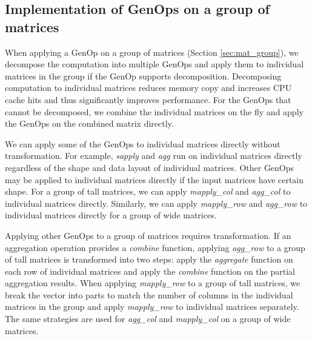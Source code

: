 \subsection{Implementation of GenOps on a group of matrices} \label{sec:group_op}

When applying a GenOp on a group of matrices (Section \ref{sec:mat_group}),
we decompose the computation into multiple GenOps and apply them to individual
matrices in the group if the GenOp supports decomposition. Decomposing computation
to individual matrices reduces memory copy and increases CPU cache hits and thus
significantly improves performance. For the GenOps that cannot be decomposed,
we combine the individual matrices on the fly and apply the GenOps on the combined
matrix directly.

We can apply some of the GenOps to individual matrices directly without
transformation. For example,
\textit{sapply} and \textit{agg} run on individual matrices directly regardless
of the shape and data layout of individual matrices. Other GenOps may be applied
to individual matrices directly if the input matrices have certain shape. For
a group of tall matrices, we can apply
\textit{mapply\_col} and \textit{agg\_col} to individual matrices directly.
Similarly, we can apply \textit{mapply\_row} and \textit{agg\_row} to
individual matrices directly for a group of wide matrices. %

Applying other GenOps to a group of matrices requires transformation. If an aggregation
operation provides a \textit{combine} function, applying \textit{agg\_row} to a group of
tall matrices is transformed into two steps: apply the \textit{aggregate} function on
each row of individual matrices and apply the \textit{combine} function on the partial
aggregation results. When applying \textit{mapply\_row} to a group of tall matrices,
we break the vector into parts to match the number of columns in the individual
matrices in the group and apply \textit{mapply\_row} to individual matrices
separately. The same strategies are used for \textit{agg\_col} and
\textit{mapply\_col} on a group of wide matrices. 

